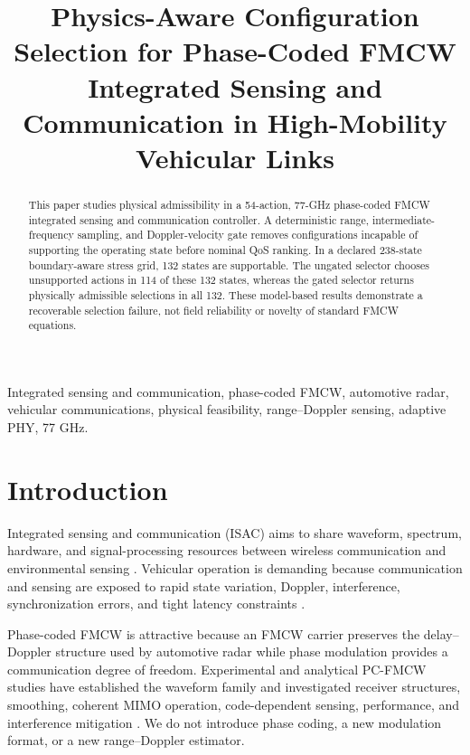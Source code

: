 \documentclass[conference,a4paper]{IEEEtran}
\title{Physics-Aware Configuration Selection for Phase-Coded FMCW Integrated Sensing and Communication in High-Mobility Vehicular Links}
\author{\IEEEauthorblockN{Panagiota Grosdouli}\IEEEauthorblockA{Affiliation and contact email to be verified before submission}}
\begin{document}
\maketitle

\begin{abstract}
This paper studies physical admissibility in a 54-action, 77-GHz phase-coded FMCW integrated sensing and communication controller. A deterministic range, intermediate-frequency sampling, and Doppler-velocity gate removes configurations incapable of supporting the operating state before nominal QoS ranking. In a declared 238-state boundary-aware stress grid, 132 states are supportable. The ungated selector chooses unsupported actions in 114 of these 132 states, whereas the gated selector returns physically admissible selections in all 132. These model-based results demonstrate a recoverable selection failure, not field reliability or novelty of standard FMCW equations.
\end{abstract}

\begin{IEEEkeywords}
Integrated sensing and communication, phase-coded FMCW, automotive radar, vehicular communications, physical feasibility, range--Doppler sensing, adaptive PHY, 77 GHz.
\end{IEEEkeywords}

\section{Introduction}
Integrated sensing and communication (ISAC) aims to share waveform, spectrum, hardware, and signal-processing resources between wireless communication and environmental sensing \cite{liu2022isac,wang2022isac}. Vehicular operation is demanding because communication and sensing are exposed to rapid state variation, Doppler, interference, synchronization errors, and tight latency constraints \cite{wang2024isac,vehicular2022isac,ma2026vehicularisac}.

Phase-coded FMCW is attractive because an FMCW carrier preserves the delay--Doppler structure used by automotive radar while phase modulation provides a communication degree of freedom. Experimental and analytical PC-FMCW studies have established the waveform family and investigated receiver structures, smoothing, coherent MIMO operation, code-dependent sensing, performance, and interference mitigation \cite{kumbul2021experimental,kumbul2022receiver,kumbul2022smoothed,kumbul2022codes,kumbul2023mimo,kumbul2023performance,kumbul2024interference}. We do not introduce phase coding, a new modulation format, or a new range--Doppler estimator.
\end{document}
